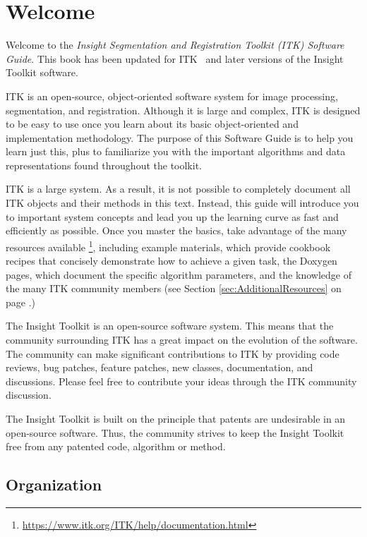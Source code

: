 \chapter{Welcome}
\label{chapter:Introduction}

Welcome to the
\emph{Insight Segmentation and Registration Toolkit (ITK) Software Guide}. This
book has been updated for ITK \ITKVERSIONMAJORMINORPATCH\ and later versions of
the Insight Toolkit software.

ITK is an open-source, object-oriented software system for image processing,
segmentation, and registration. Although it is large and complex, ITK is
designed to be easy to use once you learn about its basic object-oriented and
implementation methodology. The purpose of this Software Guide is
to help you learn just this, plus to familiarize you with the important
algorithms and data representations found throughout the toolkit.

ITK is a large system. As a result, it is not possible to completely document
all ITK objects and their methods in this text. Instead, this guide will
introduce you to important system concepts and lead you up the learning curve
as fast and efficiently as possible. Once you master the basics, take
advantage of the many resources available
\footnote{\url{https://www.itk.org/ITK/help/documentation.html}}, including example
materials, which provide cookbook recipes that concisely demonstrate how to
achieve a given task, the Doxygen pages, which document the specific algorithm
parameters, and the knowledge of the many ITK community members (see Section
\ref{sec:AdditionalResources} on page \pageref{sec:AdditionalResources}.)

The Insight Toolkit is an open-source software system. This means that the
community surrounding ITK has a great impact on the evolution of the software.
The community can make significant contributions to ITK by providing code
reviews, bug patches, feature patches, new classes, documentation, and
discussions. Please feel free to contribute your ideas through the ITK
community discussion.

The Insight Toolkit is built on the principle that patents are undesirable in
an open-source software. Thus, the community strives to keep the Insight
Toolkit free from any patented code, algorithm or method.

\section{Organization}
\label{sec:Organization}

